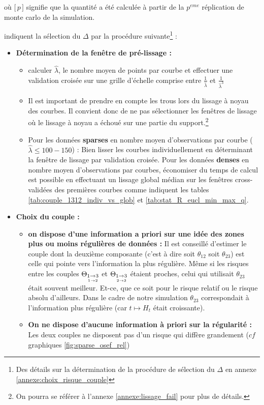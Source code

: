 \smallskip
où $[\, p \,\bigr]$ signifie que la quantité a été calculée à partir de la $p^{eme}$ réplication de monte carlo de la simulation.

\bigskip

indiquent la sélection du $\Delta$ par la procédure suivante\footnote{Des détails sur la détermination de la procédure de sélection du $\Delta$ en annexe \ref{annexe:choix_risque_couple}} :

\begin{itemize}
	\item \textbf{Détermination de la fenêtre de pré-lissage :}
	\begin{itemize}
		
		\item calculer $\widehat \lambda$, le nombre moyen de points par courbe et effectuer une validation croisée sur une grille d'échelle comprise entre $\frac{1}{\widehat \lambda}$ et $\frac{1}{\widehat \lambda^3}$

		\item Il est important de prendre en compte les \og trous \fg lors du lissage à noyau des courbes. Il convient donc de ne pas sélectionner les fenêtres de lissage où le lissage à noyau a échoué sur une partie du support.\footnote{On pourra se référer à l'annexe \ref{annexe:lissage_fail} pour plus de détails.}

		\item Pour les données \textbf{\og sparses \fg} en nombre moyen d'observations par courbe ($\widehat \lambda \leq  100-150$) : Bien lisser les courbes individuellement en déterminant la fenêtre de lissage par validation croisée. Pour les données \textbf{\og denses \fg} en nombre moyen d'observations par courbes, économiser du temps de calcul est possible en effectuant un lissage global médian sur les fenêtres cross-validées des premières courbes comme indiquent les tables \ref{tab:couple_1312_indiv_vs_glob} et \ref{tab:stat_R_eucl_min_max_q}.
	\end{itemize}


	\bigskip

	\item \textbf{Choix du couple :}

	\begin{itemize}
		\item \textbf{on dispose d'une information a priori sur une idée des zones plus ou moins régulières de données :} Il est conseillé d'estimer le couple dont la deuxième composante (c'est à dire soit $\theta_{12}$ soit $\theta_{23}$) est celle qui pointe vers l'information la plus régulière. Même si les risques entre les couples $\Theta_{\underset{1 \rightarrow 2}{1 \rightarrow 3}}$ et $\Theta_{\underset{2 \rightarrow 3}{1 \rightarrow 3}}$ étaient proches, celui qui utilisait $\theta_{23}$ était souvent meilleur. Et-ce, que ce soit pour le risque relatif ou le risque absolu d'ailleurs. Dans le cadre de notre simulation $\theta_{23}$ correspondait à l'information plus régulière (car $t \mapsto H_t$ était croissante).
		\item \textbf{On ne dispose d'aucune information à priori sur la régularité :} Les deux couples ne disposent pas d'un risque qui diffère grandement ($cf$ graphiques \ref{fig:sparse_osef_rel})
	\end{itemize}


\end{itemize}
